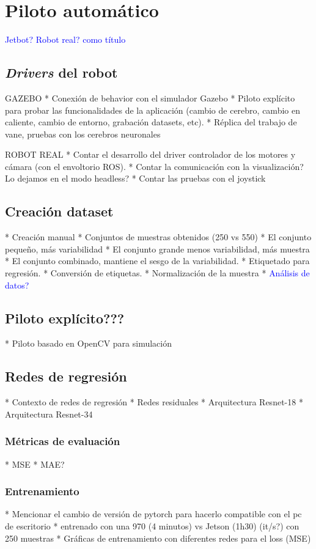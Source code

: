 \chapter{Piloto automático} \textcolor{blue}{Jetbot? Robot real? como título}

\section{\textit{Drivers} del robot}

GAZEBO
* Conexión de behavior con el simulador Gazebo
* Piloto explícito para probar las funcionalidades de la aplicación (cambio de cerebro, cambio en caliente, cambio de entorno, grabación datasets, etc).
* Réplica del trabajo de vane, pruebas con los cerebros neuronales


ROBOT REAL
* Contar el desarrollo del driver controlador de los motores y cámara (con el envoltorio ROS).
* Contar la comunicación con la visualización? Lo dejamos en el modo headless?
* Contar las pruebas con el joystick


\section{Creación dataset}
* Creación manual
* Conjuntos de muestras obtenidos (250 vs 550)
* El conjunto pequeño, más variabilidad
* El conjunto grande menos variabilidad, más muestra
* El conjunto combinado, mantiene el sesgo de la variabilidad.
* Etiquetado para regresión. 
* Conversión de etiquetas.
* Normalización de la muestra
* \textcolor{blue}{Análisis de datos?}


\section{Piloto explícito???}
* Piloto basado en OpenCV para simulación


\section{Redes de regresión}
* Contexto de redes de regresión
* Redes residuales
* Arquitectura Resnet-18
* Arquitectura Resnet-34

\subsection{Métricas de evaluación}
* MSE
* MAE?

\subsection{Entrenamiento}
* Mencionar el cambio de versión de pytorch para hacerlo compatible con el pc de escritorio
* entrenado con una 970 (4 minutos) vs Jetson (1h30) (it/s?) con 250 muestras
* Gráficas de entrenamiento con diferentes redes para el loss (MSE)

